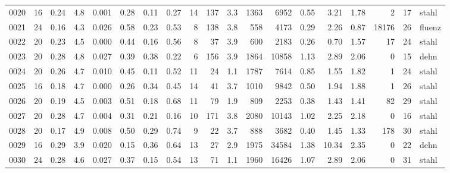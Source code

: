 {\begin{longtable}{@{}lrrrrrrrrrrrrrrrrrl@{}}
0020 & 16 & \num{0.24} & \num{4.8} & \num{0.001} & \num{0.28} & \num{0.11} & \num{0.27} & 14 & \num{137} & \num{3.3} & \num{1363} & \num{6952} & \num{0.55} & \num{3.21} & \num{1.78} & \num{2} & \num{17} & stahl \\
0021 & 24 & \num{0.16} & \num{4.3} & \num{0.026} & \num{0.58} & \num{0.23} & \num{0.53} & 8 & \num{138} & \num{3.8} & \num{558} & \num{4173} & \num{0.29} & \num{2.26} & \num{0.87} & \num{18176} & \num{26} & fluenz \\
0022 & 20 & \num{0.23} & \num{4.5} & \num{0.000} & \num{0.44} & \num{0.16} & \num{0.56} & 8 & \num{37} & \num{3.9} & \num{600} & \num{2183} & \num{0.26} & \num{0.70} & \num{1.57} & \num{17} & \num{24} & stahl \\
0023 & 20 & \num{0.28} & \num{4.8} & \num{0.027} & \num{0.39} & \num{0.38} & \num{0.22} & 6 & \num{156} & \num{3.9} & \num{1864} & \num{10858} & \num{1.13} & \num{2.89} & \num{2.06} & \num{0} & \num{15} & dehn \\
0024 & 20 & \num{0.26} & \num{4.7} & \num{0.010} & \num{0.45} & \num{0.11} & \num{0.52} & 11 & \num{24} & \num{1.1} & \num{1787} & \num{7614} & \num{0.85} & \num{1.55} & \num{1.82} & \num{1} & \num{24} & stahl \\
0025 & 16 & \num{0.18} & \num{4.7} & \num{0.000} & \num{0.26} & \num{0.34} & \num{0.45} & 14 & \num{41} & \num{3.7} & \num{1010} & \num{9842} & \num{0.50} & \num{1.94} & \num{1.88} & \num{1} & \num{26} & stahl \\
0026 & 20 & \num{0.19} & \num{4.5} & \num{0.003} & \num{0.51} & \num{0.18} & \num{0.68} & 11 & \num{79} & \num{1.9} & \num{809} & \num{2253} & \num{0.38} & \num{1.43} & \num{1.41} & \num{82} & \num{29} & stahl \\
0027 & 20 & \num{0.28} & \num{4.7} & \num{0.004} & \num{0.31} & \num{0.21} & \num{0.16} & 10 & \num{171} & \num{3.8} & \num{2080} & \num{10143} & \num{1.02} & \num{2.25} & \num{2.18} & \num{0} & \num{16} & stahl \\
0028 & 20 & \num{0.17} & \num{4.9} & \num{0.008} & \num{0.50} & \num{0.29} & \num{0.74} & 9 & \num{22} & \num{3.7} & \num{888} & \num{3682} & \num{0.40} & \num{1.45} & \num{1.33} & \num{178} & \num{30} & stahl \\
0029 & 16 & \num{0.29} & \num{3.9} & \num{0.020} & \num{0.15} & \num{0.36} & \num{0.64} & 13 & \num{27} & \num{2.9} & \num{1975} & \num{34584} & \num{1.38} & \num{10.34} & \num{2.35} & \num{0} & \num{22} & dehn \\
0030 & 24 & \num{0.28} & \num{4.6} & \num{0.027} & \num{0.37} & \num{0.15} & \num{0.54} & 13 & \num{71} & \num{1.1} & \num{1960} & \num{16426} & \num{1.07} & \num{2.89} & \num{2.06} & \num{0} & \num{31} & stahl \\

\end{longtable}}
